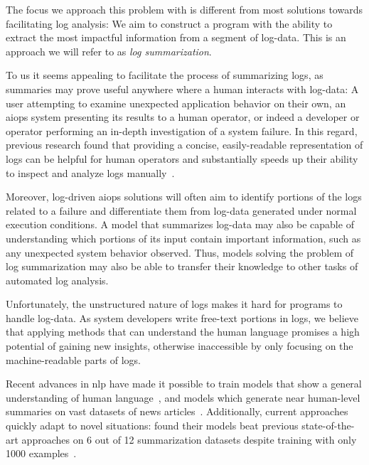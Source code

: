 The focus we approach this problem with is different
from most solutions towards facilitating log analysis:
We aim to construct a program with the ability to extract the most impactful information
from a segment of log-data.
This is an approach we will refer to as \emph{log summarization}.

To us it seems appealing to facilitate the process of summarizing logs,
as summaries may prove useful anywhere where a human interacts with log-data:
A user attempting to examine unexpected application behavior on their own,
an \ac{aiops} system presenting its results to a human operator,
or indeed a developer or operator performing an in-depth investigation of a system failure.
In this regard, previous research found that providing a concise, easily-readable representation of logs can be helpful for human operators
and substantially speeds up their ability to inspect and analyze logs manually~\parencite[11-12]{logassist}.

Moreover, log-driven \ac{aiops} solutions will often
aim to identify portions of the logs related to a failure
and differentiate them from log-data generated under normal execution conditions.
A model that summarizes log-data may also be capable of understanding which portions of its input contain important information,
such as any unexpected system behavior observed.
Thus, models solving the problem of log summarization may also be able to transfer their knowledge to other tasks of automated log analysis.

Unfortunately, the unstructured nature of logs makes it hard for programs to handle log-data.
As system developers write free-text portions in logs,
we believe that applying methods that can understand the human language
promises a high potential of gaining new insights,
otherwise inaccessible by only focusing on the machine-readable parts of logs.

Recent advances in \ac{nlp} have made it possible to train models that show a general understanding of human language~\parencites{bert}{bart},
and models which generate near human-level summaries on vast datasets of news articles~\parencite[11335]{pegasus}.
Additionally, current approaches quickly adapt to novel situations: \citeauthor*{pegasus} found
their models beat previous state-of-the-art approaches on 6 out of 12 summarization datasets despite training with only 1000 examples~\parencite[11334]{pegasus}.


